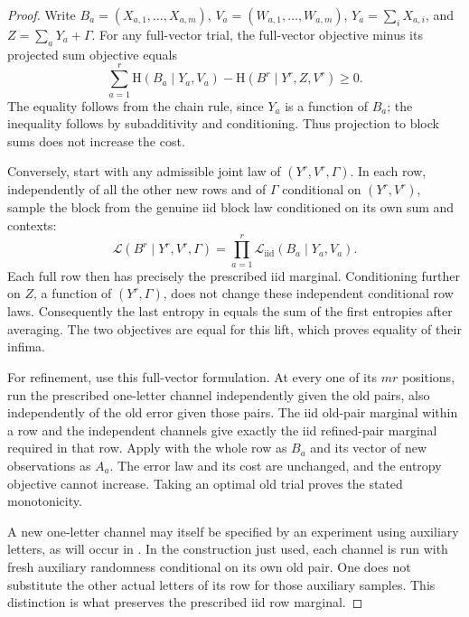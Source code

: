 \begin{proof}
Write $B_a=(X_{a,1},\ldots,X_{a,m})$, $V_a=(W_{a,1},\ldots,W_{a,m})$,
$Y_a=\sum_iX_{a,i}$, and $Z=\sum_aY_a+\Gamma$.  For any full-vector trial,
the full-vector objective minus its projected sum objective equals
\begin{equation}
\label{entropy-foundations:lift-difference}
 \sum_{a=1}^r\mathrm H(B_a\mid Y_a,V_a)
       -\mathrm H(B^r\mid Y^r,Z,V^r)\ge0.
\end{equation}
The equality follows from the chain rule, since $Y_a$ is a function of
$B_a$; the inequality follows by subadditivity and conditioning.  Thus
projection to block sums does not increase the cost.

Conversely, start with any admissible joint law of $(Y^r,V^r,\Gamma)$.
In each row, independently of all the other new rows and of $\Gamma$
conditional on $(Y^r,V^r)$, sample the block from the genuine iid block
law conditioned on its own sum and contexts:
\[
 \mathcal L(B^r\mid Y^r,V^r,\Gamma)
     =\prod_{a=1}^r
         \mathcal L_{\mathrm{iid}}(B_a\mid Y_a,V_a).
\]
Each full row then has precisely the prescribed iid marginal.  Conditioning
further on $Z$, a function of $(Y^r,\Gamma)$, does not change these
independent conditional row laws.  Consequently the last entropy in
 equals the sum of the first
entropies after averaging.  The two objectives are equal for this lift,
which proves equality of their infima.

For refinement, use this full-vector formulation.  At every one of its
$mr$ positions, run the prescribed one-letter channel independently given
the old pairs, also independently of the old error given those pairs.
The iid old-pair marginal within a row and the independent channels give
exactly the iid refined-pair marginal required in that row.  Apply
 with the whole row as $B_a$
and its vector of new observations as $A_a$.  The error law and its cost
are unchanged, and the entropy objective cannot increase.  Taking an
optimal old trial proves the stated monotonicity.

A new one-letter channel may itself be specified by an experiment using
auxiliary letters, as will occur in .  In the
construction just used, each channel is run with fresh auxiliary randomness
conditional on its own old pair.  One does not substitute the other actual
letters of its row for those auxiliary samples.  This distinction is what
preserves the prescribed iid row marginal.
\end{proof}

